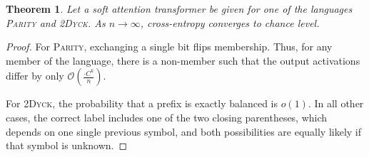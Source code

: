 \documentclass[11pt,a4paper]{article}
\newcounter{theorem}
\newtheorem{thm}[theorem]{Theorem}
\begin{document}
\begin{thm}
Let a soft attention transformer be given for one of the languages \textsc{Parity} and \textsc{2Dyck}. %
As $n\rightarrow\infty$, cross-entropy converges to chance level.
\end{thm}

\begin{proof}
For \textsc{Parity}, exchanging a single bit flips membership.
Thus, for any member of the language, there is a non-member such that the output activations differ by
only $\mathcal{O}(\frac{\cdot C^k}{n})$.

For \textsc{2Dyck}, the probability that a prefix is exactly balanced is $o(1)$.
In all other cases, the correct label includes one of the two closing parentheses, which depends on one single previous symbol, and both possibilities are equally likely if that symbol is unknown.
\end{proof}
\end{document}
